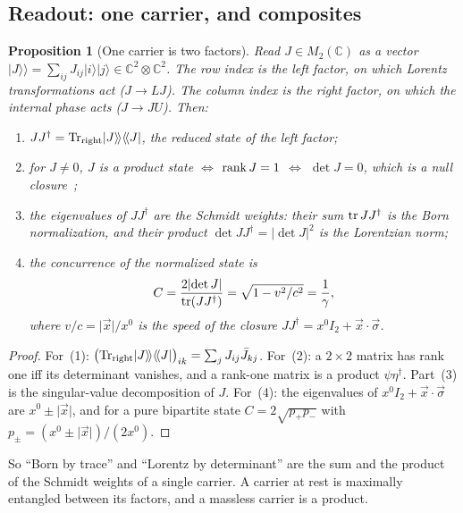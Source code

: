\documentclass[11pt]{amsart}
\newtheorem{proposition}[theorem]{Proposition}
\theoremstyle{definition}
\theoremstyle{remark}
\begin{document}
\subsection{Readout: one carrier, and composites}\label{sec:composition}

\begin{proposition}[One carrier is two factors]\label{prop:carrier}
Read $J\in M_2(\mathbb C)$ as a vector $\lvert J\rangle\!\rangle=\sum_{ij}J_{ij}\lvert i\rangle\lvert j\rangle\in\mathbb C^2\otimes\mathbb C^2$. The row index is the left factor, on which Lorentz transformations act ($J\to LJ$). The column index is the right factor, on which the internal phase acts ($J\to JU$). Then:
\begin{enumerate}
\item $JJ^\dagger={\rm Tr}_{\rm right}\lvert J\rangle\!\rangle\langle\!\langle J\rvert$, the reduced state of the left factor;
\item for $J\ne0$, $J$ is a product state $\iff$ ${\rm rank}\,J=1$ $\iff$ $\det J=0$, which is a null closure~\cite[Eq.~(40)]{Info};
\item the eigenvalues of $JJ^\dagger$ are the Schmidt weights: their sum ${\rm tr}\,JJ^\dagger$ is the Born normalization, and their product $\det JJ^\dagger=\lvert\det J\rvert^2$ is the Lorentzian norm;
\item the concurrence of the normalized state is
\[
C=\frac{2\lvert\det J\rvert}{{\rm tr}(JJ^\dagger)}=\sqrt{1-v^2/c^2}=\frac1\gamma,
\]
where $v/c=\lvert\vec x\rvert/x^0$ is the speed of the closure $JJ^\dagger=x^0I_2+\vec x\cdot\vec\sigma$.
\end{enumerate}
\end{proposition}

\begin{proof}
For~(1): $\big({\rm Tr}_{\rm right}\lvert J\rangle\!\rangle\langle\!\langle J\rvert\big)_{ik}=\sum_jJ_{ij}\bar J_{kj}$. For~(2): a $2\times2$ matrix has rank one iff its determinant vanishes, and a rank-one matrix is a product $\psi\eta^\dagger$. Part~(3) is the singular-value decomposition of $J$. For~(4): the eigenvalues of $x^0I_2+\vec x\cdot\vec\sigma$ are $x^0\pm\lvert\vec x\rvert$, and for a pure bipartite state $C=2\sqrt{p_+p_-}$ with $p_\pm=(x^0\pm\lvert\vec x\rvert)/(2x^0)$. \end{proof}

So ``Born by trace'' and ``Lorentz by determinant'' are the sum and the product of the Schmidt weights of a single carrier. A carrier at rest is maximally entangled between its factors, and a massless carrier is a product.
\end{document}
